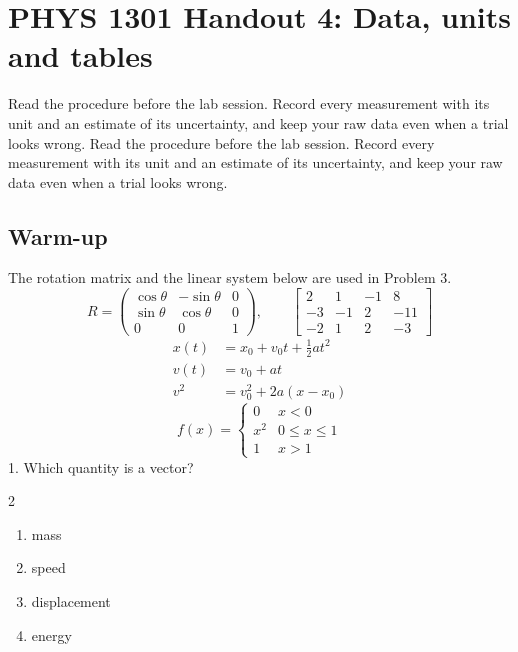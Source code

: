 \documentclass[11pt]{article}
\begin{document}
\section*{PHYS 1301 Handout 4: Data, units and tables}
Read the procedure before the lab session. Record every measurement with its unit and an estimate of its uncertainty, and keep your raw data even when a trial looks wrong. Read the procedure before the lab session. Record every measurement with its unit and an estimate of its uncertainty, and keep your raw data even when a trial looks wrong. 
\subsection*{Warm-up}
The rotation matrix and the linear system below are used in Problem 3.
\[ R = \begin{pmatrix} \cos\theta & -\sin\theta & 0 \\ \sin\theta & \cos\theta & 0 \\ 0 & 0 & 1 \end{pmatrix},
\qquad \left[\begin{array}{ccc|c} 2 & 1 & -1 & 8 \\ -3 & -1 & 2 & -11 \\ -2 & 1 & 2 & -3 \end{array}\right] \]
\begin{align*}
x(t) &= x_0 + v_0 t + \tfrac{1}{2} a t^2 \\
v(t) &= v_0 + a t \\
v^2 &= v_0^2 + 2 a (x - x_0)
\end{align*}
\[ f(x) = \begin{cases} 0 & x < 0 \\ x^2 & 0 \le x \le 1 \\ 1 & x > 1 \end{cases} \]
1. Which quantity is a vector?
\begin{multicols}{2}\begin{enumerate}\renewcommand{\labelenumi}{(\alph{enumi})}
\item mass \item speed \item displacement \item energy
\end{enumerate}\end{multicols}
\end{document}
